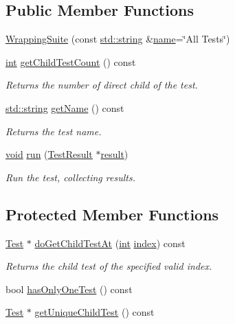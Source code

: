 \subsection*{Public Member Functions}
\begin{DoxyCompactItemize}
\item 
\hyperlink{class_test_runner_1_1_wrapping_suite_a3edce0cce0e3fdc996994d3dfe8f35fb}{Wrapping\-Suite} (const \hyperlink{glew_8h_ae84541b4f3d8e1ea24ec0f466a8c568b}{std\-::string} \&\hyperlink{fmod__codec_8h_a5c4947d4516dd7cfa3505ce3a648a4ef}{name}=\char`\"{}All Tests\char`\"{})
\item 
\hyperlink{wglew_8h_a500a82aecba06f4550f6849b8099ca21}{int} \hyperlink{class_test_runner_1_1_wrapping_suite_a5ef6d3d00fbc6493c06a2dc1f0e93077}{get\-Child\-Test\-Count} () const 
\begin{DoxyCompactList}\small\item\em Returns the number of direct child of the test. \end{DoxyCompactList}\item 
\hyperlink{glew_8h_ae84541b4f3d8e1ea24ec0f466a8c568b}{std\-::string} \hyperlink{class_test_runner_1_1_wrapping_suite_a500c7e2413a4830b87d8ab061251f856}{get\-Name} () const 
\begin{DoxyCompactList}\small\item\em Returns the test name. \end{DoxyCompactList}\item 
\hyperlink{wglew_8h_aeea6e3dfae3acf232096f57d2d57f084}{void} \hyperlink{class_test_runner_1_1_wrapping_suite_aa486bfea64b60206ac1d8fbb006f2f64}{run} (\hyperlink{class_test_result}{Test\-Result} $\ast$\hyperlink{glew_8h_a5fb5836a37f7607602a16ad733ed6357}{result})
\begin{DoxyCompactList}\small\item\em Run the test, collecting results. \end{DoxyCompactList}\end{DoxyCompactItemize}
\subsection*{Protected Member Functions}
\begin{DoxyCompactItemize}
\item 
\hyperlink{class_test}{Test} $\ast$ \hyperlink{class_test_runner_1_1_wrapping_suite_a84e5ef67fbdd8beec998923532849cb5}{do\-Get\-Child\-Test\-At} (\hyperlink{wglew_8h_a500a82aecba06f4550f6849b8099ca21}{int} \hyperlink{fmod__codec_8h_a57f14e05b1900f16a2da82ade47d0c6d}{index}) const 
\begin{DoxyCompactList}\small\item\em Returns the child test of the specified valid index. \end{DoxyCompactList}\item 
bool \hyperlink{class_test_runner_1_1_wrapping_suite_af38cfc83ff00ccc6231e479874931d04}{has\-Only\-One\-Test} () const 
\item 
\hyperlink{class_test}{Test} $\ast$ \hyperlink{class_test_runner_1_1_wrapping_suite_a6ca61a2aa4d3832525333fef9ccad961}{get\-Unique\-Child\-Test} () const 
\end{DoxyCompactItemize}


